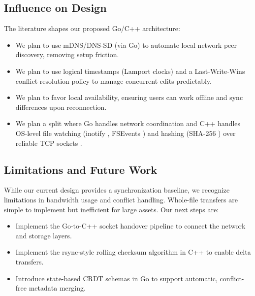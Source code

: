 \documentclass[11pt,oneside]{article}
\begin{document}
\subsection{Influence on Design}
The literature shapes our proposed Go/C++ architecture:
\begin{itemize}
    \item We plan to use mDNS/DNS-SD (via Go) to automate local network peer discovery, removing setup friction.
    \item We plan to use logical timestamps (Lamport clocks) and a Last-Write-Wins conflict resolution policy to manage concurrent edits predictably.
    \item We plan to favor local availability, ensuring users can work offline and sync differences upon reconnection.
    \item We plan a split where Go handles network coordination and C++ handles OS-level file watching (inotify \cite{inotify7}, FSEvents \cite{fsevents}) and hashing (SHA-256 \cite{fips1804}) over reliable TCP sockets \cite{rfc9293}.
\end{itemize}

\subsection{Limitations and Future Work}
While our current design provides a synchronization baseline, we recognize limitations in bandwidth usage and conflict handling. Whole-file transfers are simple to implement but inefficient for large assets. Our next steps are:
\begin{itemize}
    \item Implement the Go-to-C++ socket handover pipeline to connect the network and storage layers.
    \item Implement the rsync-style rolling checksum algorithm \cite{rsync1996} in C++ to enable delta transfers.
    \item Introduce state-based CRDT schemas \cite{shapiro2011} in Go to support automatic, conflict-free metadata merging.
\end{itemize}

\newpage


\end{document}
